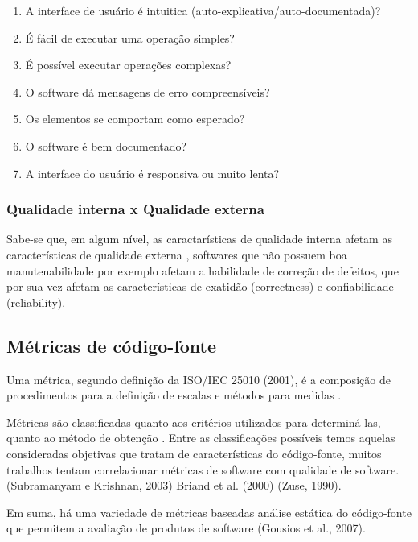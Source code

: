 \documentclass[12pt]{article}
\begin{document}
\begin{enumerate}
  \item A interface de usuário é intuitica (auto-explicativa/auto-documentada)?
  \item É fácil de executar uma operação simples?
  \item É possível executar operações complexas?
  \item O software dá mensagens de erro compreensíveis?
  \item Os elementos se comportam como esperado?
  \item O software é bem documentado?
  \item A interface do usuário é responsiva ou muito lenta?
\end{enumerate}

\subsubsection{Qualidade interna x Qualidade externa}

Sabe-se que, em algum nível, as caractarísticas de qualidade interna afetam as
características de qualidade externa \cite{McConnell2004}, softwares que não
possuem boa manutenabilidade por exemplo afetam a habilidade de correção de
defeitos, que por sua vez afetam as características de exatidão (correctness)
e confiabilidade (reliability).

\subsection{Métricas de código-fonte}

Uma métrica, segundo definição da ISO/IEC 25010 (2001), é a composição de
procedimentos para a definição de escalas e métodos para medidas
\cite{Meirelles2013}.

Métricas são classificadas quanto aos critérios utilizados para determiná-las,
quanto ao método de obtenção \cite{Meirelles2013}. Entre as classificações
possíveis temos aquelas consideradas objetivas que tratam de características
do código-fonte, muitos trabalhos tentam correlacionar métricas de software
com qualidade de software.  (Subramanyam e Krishnan, 2003) Briand et al.
(2000) (Zuse, 1990).

Em suma, há uma variedade de métricas baseadas análise estática do código-fonte que permitem
a avaliação de produtos de software (Gousios et al., 2007).

\end{document}
